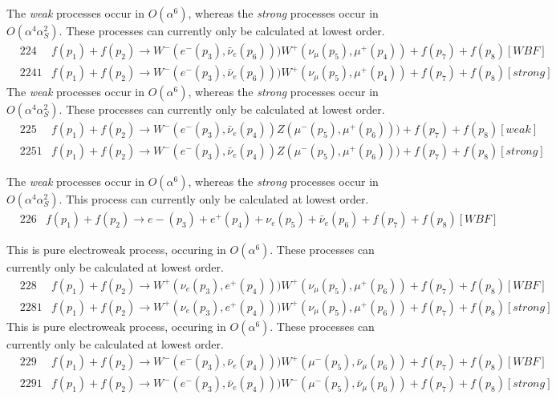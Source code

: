 The {\it weak} processes occur in $O(\alpha^6)$, whereas the {\it strong} processes occur in $O(\alpha^4 \alpha_S^2)$.
These processes can currently only be calculated at lowest order.
\begin{eqnarray}
&224   & f(p_1)+f(p_2) \to W^-(e^-(p_3),\bar{\nu}_e(p_6)))W^+(\nu_\mu(p_5),\mu^+(p_4))+f(p_7)+f(p_8) [WBF]    \nonumber 
\\
&2241  & f(p_1)+f(p_2) \to W^-(e^-(p_3),\bar{\nu}_e(p_6)))W^+(\nu_\mu(p_5),\mu^+(p_4))+f(p_7)+f(p_8) [strong]  
\nonumber   
\end{eqnarray}
%
The {\it weak} processes occur in $O(\alpha^6)$, whereas the {\it strong} processes occur in $O(\alpha^4 \alpha_S^2)$.
These processes can currently only be calculated at lowest order.
\begin{eqnarray}
&225   & f(p_1)+f(p_2) \to W^-(e^-(p_3),\bar{\nu}_e(p_4))Z(\mu^-(p_5),\mu^+(p_6)))+f(p_7)+f(p_8) [weak]    \nonumber \\
&2251  &  f(p_1)+f(p_2) \to W^-(e^-(p_3),\bar{\nu}_e(p_4))Z(\mu^-(p_5),\mu^+(p_6)))+f(p_7)+f(p_8) [strong]  \nonumber  
\end{eqnarray}


The {\it weak} processes occur in $O(\alpha^6)$, whereas the {\it strong} processes occur in $O(\alpha^4 \alpha_S^2)$.
This process can currently only be calculated at lowest order.
\begin{eqnarray}
&226  &  f(p_1)+f(p_2) \to e-(p_3)+e^+(p_4)+\nu_e(p_5)+\bar{\nu}_e(p_6)+f(p_7)+f(p_8) [WBF]    \nonumber
\end{eqnarray}

This is pure electroweak process, occuring in $O(\alpha^6)$.
These processes can currently only be calculated at lowest order.
\begin{eqnarray}
&228  &  f(p_1)+f(p_2) \to W^+(\nu_e(p_3),e^+(p_4)))W^+(\nu_\mu(p_5),\mu^+(p_6))+f(p_7)+f(p_8) [WBF]    \nonumber \\
&2281 &  f(p_1)+f(p_2) \to W^+(\nu_e(p_3),e^+(p_4)))W^+(\nu_\mu(p_5),\mu^+(p_6))+f(p_7)+f(p_8) [strong]     \nonumber
\end{eqnarray}
This is pure electroweak process, occuring in $O(\alpha^6)$.
These processes can currently only be calculated at lowest order.
\begin{eqnarray}
& 229 &   f(p_1)+f(p_2) \to W^-(e^-(p_3),\bar{\nu}_e(p_4)))W^+(\mu^-(p_5),\bar{\nu}_\mu(p_6))+f(p_7)+f(p_8) [WBF]   
\nonumber \\
&2291 &  f(p_1)+f(p_2) \to W^-(e^-(p_3),\bar{\nu}_e(p_4)))W^-(\mu^-(p_5),\bar{\nu}_\mu(p_6))+f(p_7)+f(p_8) [strong]  
\nonumber  
\end{eqnarray}

